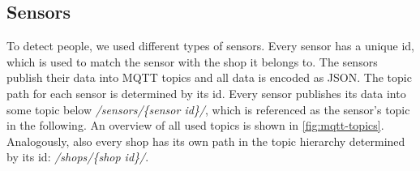 \documentclass[runningheads]{llncs}
\newcommand{\topicname}[1]{\textit{#1}}
\begin{document}
\subsection{Sensors}\label{sec:sensors}
To detect people, we used different types of sensors.
Every sensor has a unique id, which is used to match the sensor with the shop it belongs to. The sensors publish their data into MQTT topics and all data is encoded as JSON. The topic path for each sensor is determined by its id. Every sensor publishes its data into some topic below \topicname{/sensors/\{sensor id\}/}, which is referenced as the sensor's topic in the following. An overview of all used topics is shown in \cref{fig:mqtt-topics}. Analogously, also every shop has its own path in the topic hierarchy determined by its id: \topicname{/shops/\{shop id\}/}.
\end{document}
